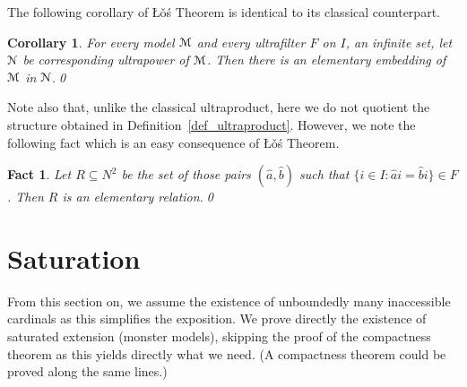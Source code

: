 \documentclass[12pt,letterpaper,oneside,reqno]{amsart}
\theoremstyle{plain}
\newtheorem{fact}[theorem]{Fact}
\newtheorem{corollary}[theorem]{Corollary}
\theoremstyle{remark}
\begin{document}





The following corollary of  \L\v{o}\'s Theorem is identical to its classical counterpart.

\begin{corollary}
  For every model ${\EuScript M}$ and every ultrafilter $F$ on $I$, an infinite set, let ${\EuScript N}$ be corresponding ultrapower of ${\EuScript M}$.
  Then there is an elementary embedding of ${\EuScript M}$ in ${\EuScript N}$.\qed
\end{corollary}

Note also that, unlike the classical ultraproduct, here we do not quotient the structure obtained in Definition~\ref{def_ultraproduct}.
However, we note the following fact which is an easy consequence of \L\v o\'s Theorem.

\begin{fact}
  Let $R\subseteq N^2$ be the set of those pairs $(\hat a, \hat b)$ such that $\{i\in I:\hat ai=\hat bi\}\in F$.
  Then $R$ is an elementary relation.\qed
\end{fact}

\section{Saturation}\label{saturation}

\def\ceq#1#2#3{\parbox[t]{20ex}{$\displaystyle #1$}\parbox{5ex}{\hfil $#2$}{$\displaystyle #3$}}

From this section on, we assume the existence of unboundedly many inaccessible cardinals as this simplifies the exposition.
We prove directly the existence of saturated extension (monster models), skipping the proof of the compactness theorem as this yields directly what we need.
(A compactness theorem could be proved along the same lines.)
\end{document}
